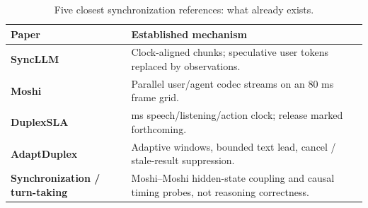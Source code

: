 \begin{table}[H]
\centering\small
\setlength{\tabcolsep}{4pt}
\setlength{\tablewidth}{\dimexpr\linewidth-2\tabcolsep\relax}
\renewcommand{\arraystretch}{1.06}
\caption{Five closest synchronization references: what already exists.}
\label{tab:synchronization}
\begin{tabular}{@{}>{\raggedright\arraybackslash}p{0.38\tablewidth}>{\raggedright\arraybackslash}p{0.62\tablewidth}@{}}
\toprule
\textbf{Paper} & \textbf{Established mechanism} \\
\midrule
\textbf{SyncLLM} \citep{syncllm} & Clock-aligned chunks; speculative user tokens replaced by observations. \\
\addlinespace[2pt]
\textbf{Moshi} \citep{moshi} & Parallel user/agent codec streams on an 80 ms frame grid. \\
\addlinespace[2pt]
\textbf{DuplexSLA} \citep{duplexsla} & 160 ms speech/listening/action clock; release marked forthcoming. \\
\addlinespace[2pt]
\textbf{AdaptDuplex} \citep{adapt} & Adaptive windows, bounded text lead, cancel / stale-result suppression. \\
\addlinespace[2pt]
\textbf{Synchronization / turn-taking} \citep{synchrony} & Moshi--Moshi hidden-state coupling and causal timing probes, not reasoning correctness. \\
\bottomrule
\end{tabular}
\end{table}
